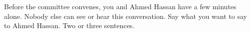 Before the committee convenes, you and Ahmed Hassan have a few minutes alone. Nobody else can see or hear this conversation. Say what you want to say to Ahmed Hassan. Two or three sentences.%
